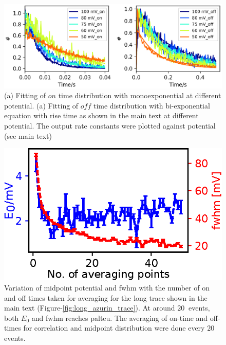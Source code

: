 \documentclass[11pt,a4paper,onecolumn]{article}
\begin{document}
\begin{figure}
  \centering
  \includegraphics{rate_fit_all_potential}
  \makeatletter
  \renewcommand{\fnum@figure}{\figurename~S\thefigure}
  \makeatother
  \caption{(a) Fitting of $on$ time distribution with monoexponential at different potential.
  (a) Fitting of $off$ time distribution with bi-exponential equation with rise time as shown in the main text at different potential.
  The output rate constants were plotted against potential (see main text)}
  \label{SIfig: rate_fit_all_potential}
\end{figure}
\begin{figure}
  \centering
  \includegraphics[scale=1.5]{N_avgpoints_vs_fwhmwidth}
  \makeatletter
  \renewcommand{\fnum@figure}{\figurename~S\thefigure}
  \makeatother
  \caption{Variation of midpoint potential and fwhm with the number of on and off times taken for averaging for the long trace shown in the main text (Figure-\ref{fig:long_azurin_trace}). At around $20~$ events, both $E_0$ and fwhm reaches palteu.
  The averaging of on-time and off-times for correlation and midpoint distribution were done every $20$ events.}
  \label{SIfig: N_avgpoints_vs_fwhmwidth}
\end{figure}
\end{document}
